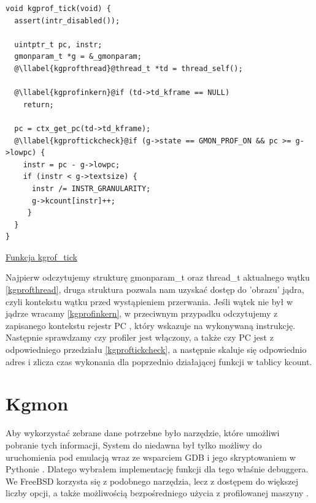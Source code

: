 \documentclass[shortabstract]{iithesis}
\makeatletter
\theoremstyle{definition} \newtheorem*{definition}{Definicja}
\theoremstyle{definition} \newtheorem*{example}{Przykład}
\theoremstyle{definition} \newtheorem*{remark}{Uwaga}
\newenvironment{longlisting}{\captionsetup{type=listing}}{}
\newcounter{llabel}[listing]%
\renewcommand*{\thellabel}{%
    \ifnum\value{llabel}<0 %
      \@ctrerr
    \else
      \ifnum\value{llabel}>10 %
        \@ctrerr
      \else
        \protect\ding{\the\numexpr\value{llabel}+201\relax}%
      \fi
    \fi
  }%
\newlength{\llabelsep}
\newcommand*{\llabel}[1]{%
  \begingroup
  \refstepcounter{llabel}%
  \label{#1}%
  \llap{\thellabel\kern\llabelsep}%
  \endgroup
}
\makeatother
\begin{document}
\begin{longlisting}
  \begin{verbatim}
void kgprof_tick(void) {
  assert(intr_disabled());

  uintptr_t pc, instr;
  gmonparam_t *g = &_gmonparam;
  @\llabel{kgprofthread}@thread_t *td = thread_self();

  @\llabel{kgprofinkern}@if (td->td_kframe == NULL)
    return;

  pc = ctx_get_pc(td->td_kframe);
  @\llabel{kgproftickcheck}@if (g->state == GMON_PROF_ON && pc >= g->lowpc) {
    instr = pc - g->lowpc;
    if (instr < g->textsize) {
      instr /= INSTR_GRANULARITY;
      g->kcount[instr]++;
     }
  }
}
  \end{verbatim}
  \caption{\href{https://mimiker.ii.uni.wroc.pl/source/xref/mimiker/sys/kern/kgprof.c?r=27b8c19a\#49}{Funkcja kgrof\_tick}}
  \label{lst:funckgproftck}
\end{longlisting}

Najpierw odczytujemy strukturę gmonparam\_t oraz thread\_t aktualnego wątku \ref{kgprofthread}, druga struktura pozwala nam uzyskać dostęp do 'obrazu' jądra, czyli kontekstu wątku przed wystąpieniem przerwania.
Jeśli wątek nie był w jądrze wracamy \ref{kgprofinkern}, w przeciwnym przypadku odczytujemy z zapisanego kontekstu rejestr PC , który wskazuje na wykonywaną instrukcję. Następnie sprawdzamy czy profiler jest włączony, a także czy PC jest z odpowiedniego przedziału \ref{kgproftickcheck}, a następnie skaluje się odpowiednio adres i zlicza czas wykonania dla poprzednio działającej funkcji w tablicy kcount.

\section{Kgmon}

Aby wykorzystać zebrane dane potrzebne było narzędzie, które umożliwi pobranie tych informacji, System do niedawna był tylko możliwy do uruchomienia pod emulacją wraz ze wsparciem GDB i jego skryptowaniem w Pythonie \cite{bib:gdb-python}. Dlatego wybrałem implementację funkcji dla tego właśnie debuggera. We FreeBSD korzysta się z podobnego narzędzia, lecz z dostępem do większej liczby opcji, a także możliwością bezpośredniego użycia z profilowanej maszyny \cite{bib:freebsdkgmon}.
\end{document}
